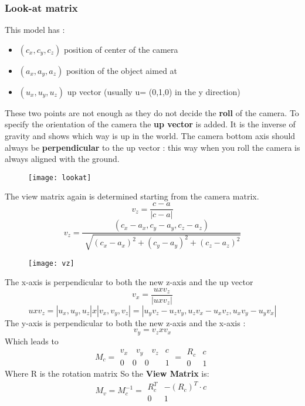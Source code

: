 \subsubsection{Look-at matrix}
This model has :
\begin{itemize}
\item $(c_x,c_y,c_z)$ position of center of the camera
\item $(a_x,a_y,a_z)$ position of the object aimed at
\item $(u_x,u_y,u_z) $ up vector (usually u= (0,1,0) in the y direction)
\end{itemize}
These two points are not enough as they do not decide the \textbf{roll} of the camera. To specify the orientation of the camera the \textbf{up vector} is added.
It is the inverse of gravity and shows which way is up in the world. The camera bottom axis should always be \textbf{perpendicular} to the up vector : this way when you roll the camera is always aligned with the ground.\\
\begin{figure}[H]
  \centering
  \texttt{[image: lookat]}
\end{figure}
\newpage
The view matrix again is determined starting from the camera matrix.
$$ v_z = \frac{c-a}{|c-a|}$$
$$ v_z = \frac{(c_x-a_x,c_y-a_y,c_z-a_z)}{\sqrt[]{(c_x-a_x)^2+(c_y-a_y)^2+(c_z-a_z)^2}} $$
\begin{figure}[H]
  \centering
  \texttt{[image: vz]}
\end{figure}
The x-axis is perpendicular to both the new z-axis and the up vector 
$$ v_x = \frac{u x v_z}{|u x v_z|}$$
$$ u x v_z = |u_x,u_y,u_z|x|v_x,v_y,v_z| = |u_yv_z-u_zv_y,u_zv_x-u_xv_z,u_xv_y-u_yv_x|$$
The y-axis is perpendicular to both the new z-axis and the x-axis :
$$ v_y = v_z x v_x$$
Which leads to 
\[
\boxed{M_c=\begin{array}{c|c}
  v_x \quad v_y \quad v_z& c \\ 
  \hline
  0 \quad 0 \quad 0  & 1
 \end{array} = \begin{array}{c|c}
  R_c & c \\ 
  \hline
  0 & 1
 \end{array}}
\]
Where R is the rotation matrix
So the \textbf{View Matrix} is: 
\[
\boxed{M_v=M_c^{-1}=\begin{array}{c|c}
  R_c^{T} & -(R_c)^T \cdot c \\ 
  \hline
  0  & 1
 \end{array}}
\]
\newpage
